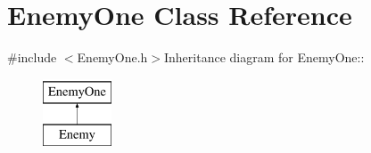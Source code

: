 \hypertarget{classEnemyOne}{
\section{EnemyOne Class Reference}
\label{classEnemyOne}
}


{\ttfamily \#include $<$EnemyOne.h$>$}Inheritance diagram for EnemyOne::\begin{figure}[H]
\begin{center}
\leavevmode
\includegraphics[height=2cm]{classEnemyOne}
\end{center}
\end{figure}
